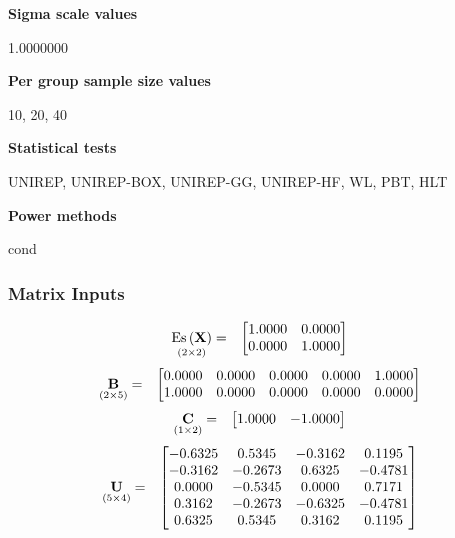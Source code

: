 \documentclass{glimmpse-report}
\begin{document}
{\bf Sigma scale values}

1.0000000

{\bf Per group sample size values}

10, 20, 40

{\bf Statistical tests}

UNIREP, UNIREP-BOX, UNIREP-GG, UNIREP-HF, WL, PBT, HLT

{\bf Power methods}

cond

\subsubsection{Matrix Inputs}

\begin{eqnarray*}
\underset{\left(2\times2\right)}{\text{Es}\left(\mathbf{X}\right)} & = & \begin{bmatrix}1.0000 & 0.0000\protect\\
0.0000 & 1.0000\protect\\
\end{bmatrix}
\end{eqnarray*}
\begin{eqnarray*}
\underset{\left(2\times5\right)}{\mathbf{B}} & = & \begin{bmatrix}0.0000 & 0.0000 & 0.0000 & 0.0000 & 1.0000\protect\\
1.0000 & 0.0000 & 0.0000 & 0.0000 & 0.0000\protect\\
\end{bmatrix}
\end{eqnarray*}
\begin{eqnarray*}
\underset{\left(1\times2\right)}{\mathbf{C}} & = & \begin{bmatrix}1.0000 & -1.0000\protect\\
\end{bmatrix}
\end{eqnarray*}
\begin{eqnarray*}
\underset{\left(5\times4\right)}{\mathbf{U}} & = & \begin{bmatrix}-0.6325 & 0.5345 & -0.3162 & 0.1195\protect\\
-0.3162 & -0.2673 & 0.6325 & -0.4781\protect\\
0.0000 & -0.5345 & 0.0000 & 0.7171\protect\\
0.3162 & -0.2673 & -0.6325 & -0.4781\protect\\
0.6325 & 0.5345 & 0.3162 & 0.1195\protect\\
\end{bmatrix}
\end{eqnarray*}
\end{document}
